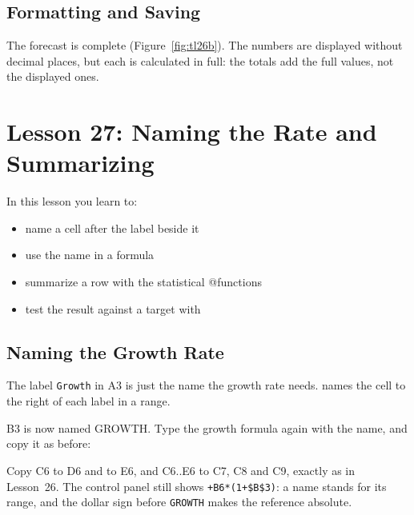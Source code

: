 \subsection{Formatting and Saving}
\begin{Keystrokes}
\end{Keystrokes}
The forecast is complete (Figure~\ref{fig:tl26b}).  The numbers are
displayed without decimal places, but each is calculated in full: the
totals add the full values, not the displayed ones.

\section{Lesson 27: Naming the Rate and Summarizing}
In this lesson you learn to:
\begin{itemize}
\item name a cell after the label beside it
\item use the name in a formula
\item summarize a row with the statistical @functions
\item test the result against a target with 
\end{itemize}

\subsection{Naming the Growth Rate}
The label \texttt{Growth} in A3 is just the name the growth rate needs.
 names the cell to the right of each
label in a range.

\begin{Keystrokes}
\end{Keystrokes}
B3 is now named GROWTH.  Type the growth formula again with the name, and
copy it as before:

\begin{Keystrokes}
\end{Keystrokes}
Copy C6 to D6 and to E6, and C6..E6 to C7, C8 and C9, exactly as in
Lesson~26.  The control panel still shows \texttt{+B6*(1+\$B\$3)}: a name
stands for its range, and the dollar sign before \texttt{GROWTH} makes the
reference absolute.

